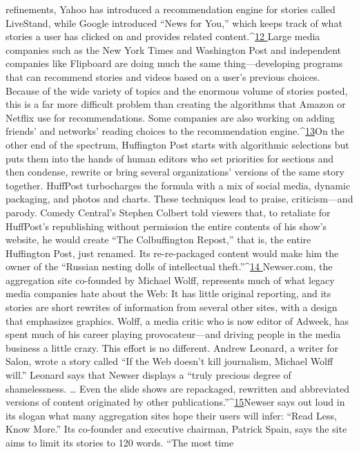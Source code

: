 refinements, Yahoo has introduced a recommendation engine for stories called
LiveStand, while Google introduced ``News for You,'' which keeps track of what
stories a user has clicked on and provides related content.^{\href{#endnotes-ch6}{12 }}Large media companies
such as the New York Times and Washington Post and independent companies
like Flipboard are doing much the same thing—developing programs that
can recommend stories and videos based on a user’s previous choices. Because of
the wide variety of topics and the enormous volume of stories posted, this is a far
more difficult problem than creating the algorithms that Amazon or Netflix use
for recommendations. Some companies are also working on adding friends’ and
networks’ reading choices to the recommendation engine.^{\href{#endnotes-ch6}{13}}On the other end of the spectrum, Huffington Post starts with algorithmic
selections but puts them into the hands of human editors who set priorities for
sections and then condense, rewrite or bring several organizations’ versions of the
same story together. HuffPost turbocharges the formula with a mix of social media,
dynamic packaging, and photos and charts. These techniques lead to praise,
criticism—and parody. Comedy Central’s Stephen Colbert told viewers that, to
retaliate for HuffPost’s republishing without permission the entire contents of his
show’s website, he would create ``The Colbuffington Repost,'' that is, the entire
Huffington Post, just renamed. Its re-re-packaged content would make him the
owner of the ``Russian nesting dolls of intellectual theft.''^{\href{#endnotes-ch6}{14
}}Newser.com, the aggregation site co-founded by Michael Wolff, represents
much of what legacy media companies hate about the Web: It has little original
reporting, and its stories are short rewrites of information from several other sites,
with a design that emphasizes graphics. Wolff, a media critic who is now editor of
Adweek, has spent much of his career playing provocateur—and driving people
in the media business a little crazy. This effort is no different. Andrew Leonard,
a writer for Salon, wrote a story called ``If the Web doesn’t kill journalism, Michael
Wolff will.'' Leonard says that Newser displays a ``truly precious degree of
shamelessness. … Even the slide shows are repackaged, rewritten and abbreviated
versions of content originated by other publications.''^{\href{#endnotes-ch6}{15}}Newser says out loud in its slogan what many aggregation sites hope their users
will infer: ``Read Less, Know More.'' Its co-founder and executive chairman,
Patrick Spain, says the site aims to limit its stories to 120 words. ``The most time
